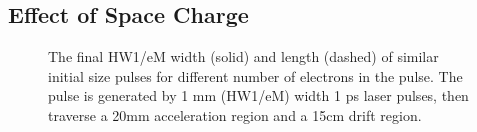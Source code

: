 \subsection{Effect of Space Charge} \label{sec:free_spacecharge}

\begin{figure}
  \centering
  \begin{tikzpicture}
    
  \end{tikzpicture}
  \caption[Free-space pulse evolution vs initial shape]{
    The final HW1/eM width (solid) and length (dashed) of similar initial size pulses for different number of electrons in the pulse.
    The pulse is generated by 1 mm (HW1/eM) width 1 ps laser pulses, then traverse a 20mm acceleration region and a 15cm drift region.
  }
  \label{fig:spacecharge}
\end{figure}

